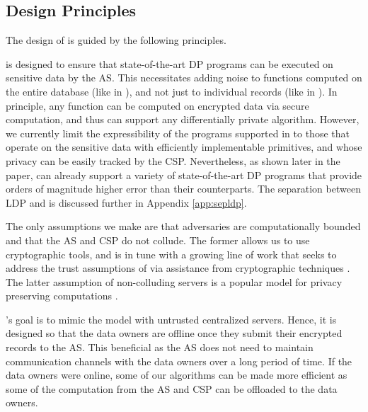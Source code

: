  

\subsection{\system Design Principles}\label{sec:discuss-arch}
The design of \system is guided by the following principles. 

 \system is designed to ensure that state-of-the-art DP programs can be executed on sensitive data by the \textsf{AS}. This necessitates adding noise to functions computed on the entire database (like in \cdp), and not just to individual records (like in \ldp). In principle, any function can be computed on encrypted data via secure computation, and thus \system can support any differentially private algorithm. However, we currently limit the expressibility of the programs supported in \system to those that operate on the sensitive data with efficiently implementable primitives, and whose privacy can be easily tracked by the \textsf{CSP}. Nevertheless, as shown later in the paper, \system can already support a variety of state-of-the-art DP programs that provide orders of magnitude higher error than their \ldp counterparts. The separation between \textsf{LDP} and \system is discussed further in Appendix \ref{app:sepldp}.

 The only assumptions we make are that adversaries are computationally bounded and that the \textsf{AS} and  \textsf{CSP} do not collude. The former allows us to use cryptographic tools, and is in tune with a growing line of work that seeks to address the trust assumptions of \cdp via assistance from cryptographic techniques \cite{Prochlo,mixnets,amplification,Shi,Shi2,kamara,Rastogi}. The latter assumption of non-colluding servers is a popular model for privacy preserving computations \cite{Boneh1,Boneh2,Ridge2,Matrix2,secureML,LReg,Ver}.

 \system's goal is to mimic the \cdp model with untrusted centralized servers. Hence, it is designed so that the data owners are offline once they submit their encrypted records to the \textsf{AS}. This beneficial as the \textsf{AS} does not need to maintain communication channels with the data owners over a long period of time. If the data owners were online, some of our algorithms can be made more efficient as some of the computation from the \textsf{AS} and \textsf{CSP} can be offloaded to the data owners.

